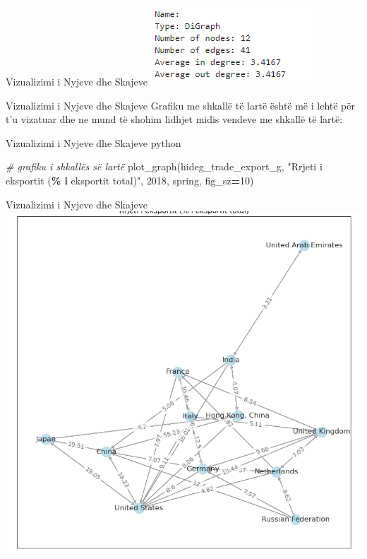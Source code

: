 \documentclass[
  ignorenonframetext,
]{beamer}
\newenvironment{Shaded}{\begin{snugshade}}{\end{snugshade}}
\newcommand{\CommentTok}[1]{\textcolor[rgb]{0.56,0.35,0.01}{\textit{#1}}}
\newcommand{\DecValTok}[1]{\textcolor[rgb]{0.00,0.00,0.81}{#1}}
\newcommand{\NormalTok}[1]{#1}
\newcommand{\OperatorTok}[1]{\textcolor[rgb]{0.81,0.36,0.00}{\textbf{#1}}}
\newcommand{\SpecialCharTok}[1]{\textcolor[rgb]{0.81,0.36,0.00}{\textbf{#1}}}
\newcommand{\StringTok}[1]{\textcolor[rgb]{0.31,0.60,0.02}{#1}}
\begin{document}
\begin{frame}{Vizualizimi i Nyjeve dhe Skajeve}
\protect\hypertarget{vizualizimi-i-nyjeve-dhe-skajeve-5}{}
\includegraphics{./Figs/difrrjet1.png}
\end{frame}

\begin{frame}{Vizualizimi i Nyjeve dhe Skajeve}
\protect\hypertarget{vizualizimi-i-nyjeve-dhe-skajeve-6}{}
Grafiku me shkallë të lartë është më i lehtë për t'u vizatuar dhe ne
mund të shohim lidhjet midis vendeve me shkallë të lartë:
\end{frame}

\begin{frame}[fragile]{Vizualizimi i Nyjeve dhe Skajeve}
\protect\hypertarget{vizualizimi-i-nyjeve-dhe-skajeve-7}{}
python

\begin{Shaded}
\begin{Highlighting}[]
\CommentTok{\# grafiku i shkallës së lartë}
\NormalTok{plot\_graph(hideg\_trade\_export\_g, }\StringTok{"Rrjeti i eksportit (}\SpecialCharTok{\% i}\StringTok{ eksportit total)"}\NormalTok{, }\StringTok{\textquotesingle{}2018\textquotesingle{}}\NormalTok{, }\StringTok{\textquotesingle{}spring\textquotesingle{}}\NormalTok{, fig\_sz}\OperatorTok{=}\DecValTok{10}\NormalTok{)}
\end{Highlighting}
\end{Shaded}
\end{frame}

\begin{frame}{Vizualizimi i Nyjeve dhe Skajeve}
\protect\hypertarget{vizualizimi-i-nyjeve-dhe-skajeve-8}{}
\includegraphics{./Figs/difrrjet2.png}
\end{frame}
\end{document}
